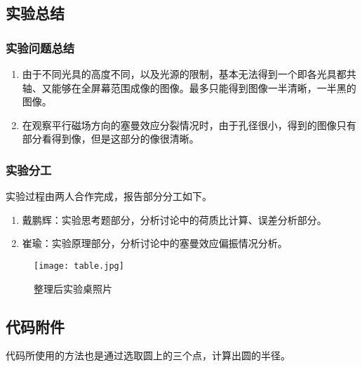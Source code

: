 \documentclass[dvipsnames, svgnames,a4paper,11pt]{article}
\begin{document}
\subsection{实验总结}
    
    \subsubsection{实验问题总结}

        \begin{enumerate}
            \item 由于不同光具的高度不同，以及光源的限制，基本无法得到一个即各光具都共轴、又能够在全屏幕范围成像的图像。最多只能得到图像一半清晰，一半黑的图像。
            \item 在观察平行磁场方向的塞曼效应分裂情况时，由于孔径很小，得到的图像只有部分看得到像，但是这部分的像很清晰。
        \end{enumerate}

    \subsubsection{实验分工}
		实验过程由两人合作完成，报告部分分工如下。
        \begin{enumerate}
            \item 戴鹏辉：实验思考题部分，分析讨论中的荷质比计算、误差分析部分。
            \item 崔瑜：实验原理部分，分析讨论中的塞曼效应偏振情况分析。
        \end{enumerate}

    \begin{figure}[htbp]
        \centering
        \texttt{[image: table.jpg]}
        \caption{整理后实验桌照片}
        \label{fig:table}
    \end{figure}

	


\subsection{代码附件}

	代码所使用的方法也是通过选取圆上的三个点，计算出圆的半径。

\end{document}
